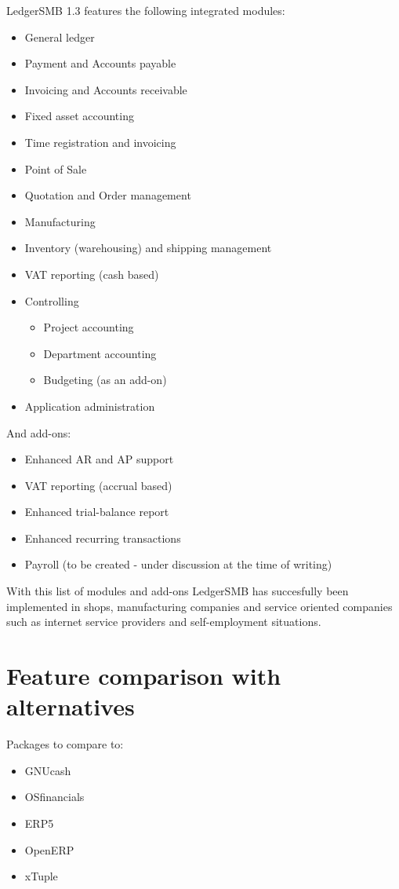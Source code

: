 \documentclass[10pt,A4]{book}
\begin{document}
LedgerSMB 1.3 features the following integrated modules:

\begin{itemize}
\item General ledger
\item Payment and Accounts payable
\item Invoicing and Accounts receivable
\item Fixed asset accounting
\item Time registration and invoicing
\item Point of Sale
\item Quotation and Order management
\item Manufacturing
\item Inventory (warehousing) and shipping management
\item VAT reporting (cash based)
\item Controlling
\begin{itemize}
\item Project accounting
\item Department accounting
\item Budgeting (as an add-on)
\end{itemize}
\item Application administration
\end{itemize}

And add-ons:
\begin{itemize}
\item Enhanced AR and AP support
\item VAT reporting (accrual based)
\item Enhanced trial-balance report
\item Enhanced recurring transactions
\item Payroll (to be created - under discussion at the time of writing)
\end{itemize}

With this list of modules and add-ons LedgerSMB has succesfully been implemented
in shops, manufacturing companies and service oriented companies such as internet
service providers and self-employment situations.

\section{Feature comparison with alternatives}

Packages to compare to:

\begin{itemize}
\item GNUcash
\item OSfinancials
\item ERP5
\item OpenERP
\item xTuple
\end{itemize}
\end{document}
